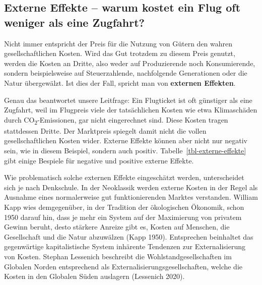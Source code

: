 \documentclass[
  nswissgerman,
  a4paper,
  DIV=11,
  numbers=noendperiod,
  oneside,
  openany]{scrreprt}
\begin{document}
\subsection{Externe Effekte -- warum kostet ein Flug oft weniger als
eine
Zugfahrt?}\label{externe-effekte-warum-kostet-ein-flug-oft-weniger-als-eine-zugfahrt}

Nicht immer entspricht der Preis für die Nutzung von Gütern den wahren
gesellschaftlichen Kosten. Wird das Gut trotzdem zu diesem Preis
genutzt, werden die Kosten an Dritte, also weder auf Produzierende noch
Konsumierende, sondern beispielsweise auf Steuerzahlende, nachfolgende
Generationen oder die Natur übergewälzt. Ist dies der Fall, spricht man
von \textbf{externen Effekten}.

Genau das beantwortet unsere Leitfrage: Ein Flugticket ist oft günstiger
als eine Zugfahrt, weil im Flugpreis viele der tatsächlichen Kosten wie
etwa Klimaschäden durch CO\textsubscript{2}-Emissionen, gar nicht
eingerechnet sind. Diese Kosten tragen stattdessen Dritte. Der
Marktpreis spiegelt damit nicht die vollen gesellschaftlichen Kosten
wider. Externe Effekte können aber nicht nur negativ sein, wie in diesem
Beispiel, sondern auch positiv. Tabelle~\ref{tbl-externe-effekte} gibt
einige Bespiele für negative und positive externe Effekte.

Wie problematisch solche externen Effekte eingeschätzt werden,
unterscheidet sich je nach Denkschule. In der Neoklassik werden externe
Kosten in der Regel als Ausnahme eines normalerweise gut
funktionierenden Marktes verstanden. William Kapp wies demgegenüber, in
der Tradition der ökologischen Ökonomik, schon 1950 darauf hin, dass je
mehr ein System auf der Maximierung von privatem Gewinn beruht, desto
stärkere Anreize gibt es, Kosten auf Menschen, die Gesellschaft und die
Natur abzuwälzen (Kapp 1950). Entsprechen beinhaltet das gegenwärtige
kapitalistische System inhärente Tendenzen zur Externalisierung von
Kosten. Stephan Lessenich beschreibt die Wohlstandgesellschaften im
Globalen Norden entsprechend als Externalisierungsgesellschaften, welche
die Kosten in den Globalen Süden auslagern (Lessenich 2020).
\end{document}
